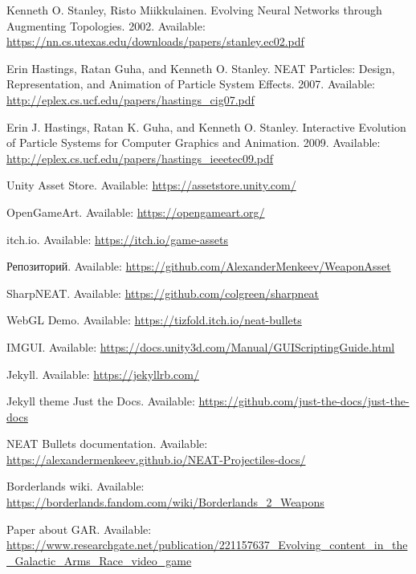 \begin{thebibliography}{1}

     Kenneth O. Stanley, Risto Miikkulainen. \flqq Evolving Neural Networks through Augmenting Topologies\frqq. 2002. Available: \url{https://nn.cs.utexas.edu/downloads/papers/stanley.ec02.pdf}

     Erin Hastings, Ratan Guha, and Kenneth O. Stanley. \flqq NEAT Particles: Design, Representation, and Animation of Particle System Effects\frqq. 2007. Available: \url{http://eplex.cs.ucf.edu/papers/hastings_cig07.pdf}

     Erin J. Hastings, Ratan K. Guha, and Kenneth O. Stanley. \flqq Interactive Evolution of Particle Systems for Computer Graphics and Animation\frqq. 2009. Available: \url{http://eplex.cs.ucf.edu/papers/hastings_ieeetec09.pdf}

     Unity Asset Store. Available: \url{https://assetstore.unity.com/}

     OpenGameArt. Available: \url{https://opengameart.org/}

     itch.io. Available: \url{https://itch.io/game-assets}

     Репозиторий. Available: \url{https://github.com/AlexanderMenkeev/WeaponAsset}

     SharpNEAT. Available: \url{https://github.com/colgreen/sharpneat}

     WebGL Demo. Available: \url{https://tizfold.itch.io/neat-bullets}

     IMGUI. Available: \url{https://docs.unity3d.com/Manual/GUIScriptingGuide.html}

     Jekyll. Available: \url{https://jekyllrb.com/}

     Jekyll theme Just the Docs. Available: \url{https://github.com/just-the-docs/just-the-docs}

     NEAT Bullets documentation. Available: \url{https://alexandermenkeev.github.io/NEAT-Projectiles-docs/}

     Borderlands wiki. Available: \url{https://borderlands.fandom.com/wiki/Borderlands_2_Weapons}

     Paper about GAR. Available: \url{https://www.researchgate.net/publication/221157637_Evolving_content_in_the_Galactic_Arms_Race_video_game}


\end{thebibliography}

